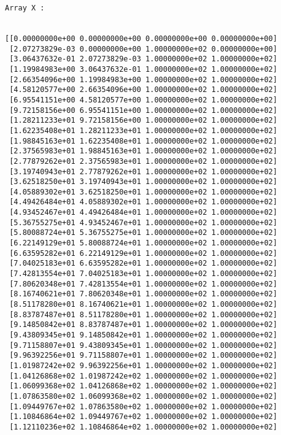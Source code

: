 \documentclass[11pt]{article}
\begin{document}
    \begin{Verbatim}[commandchars=\\\{\}]
Array X : 


[[0.00000000e+00 0.00000000e+00 0.00000000e+00 0.00000000e+00]
 [2.07273829e-03 0.00000000e+00 1.00000000e+02 0.00000000e+00]
 [3.06437632e-01 2.07273829e-03 1.00000000e+02 1.00000000e+02]
 [1.19984983e+00 3.06437632e-01 1.00000000e+02 1.00000000e+02]
 [2.66354096e+00 1.19984983e+00 1.00000000e+02 1.00000000e+02]
 [4.58120577e+00 2.66354096e+00 1.00000000e+02 1.00000000e+02]
 [6.95541151e+00 4.58120577e+00 1.00000000e+02 1.00000000e+02]
 [9.72158156e+00 6.95541151e+00 1.00000000e+02 1.00000000e+02]
 [1.28211233e+01 9.72158156e+00 1.00000000e+02 1.00000000e+02]
 [1.62235408e+01 1.28211233e+01 1.00000000e+02 1.00000000e+02]
 [1.98845163e+01 1.62235408e+01 1.00000000e+02 1.00000000e+02]
 [2.37565983e+01 1.98845163e+01 1.00000000e+02 1.00000000e+02]
 [2.77879262e+01 2.37565983e+01 1.00000000e+02 1.00000000e+02]
 [3.19740943e+01 2.77879262e+01 1.00000000e+02 1.00000000e+02]
 [3.62518250e+01 3.19740943e+01 1.00000000e+02 1.00000000e+02]
 [4.05889302e+01 3.62518250e+01 1.00000000e+02 1.00000000e+02]
 [4.49426484e+01 4.05889302e+01 1.00000000e+02 1.00000000e+02]
 [4.93452467e+01 4.49426484e+01 1.00000000e+02 1.00000000e+02]
 [5.36755275e+01 4.93452467e+01 1.00000000e+02 1.00000000e+02]
 [5.80088724e+01 5.36755275e+01 1.00000000e+02 1.00000000e+02]
 [6.22149129e+01 5.80088724e+01 1.00000000e+02 1.00000000e+02]
 [6.63595282e+01 6.22149129e+01 1.00000000e+02 1.00000000e+02]
 [7.04025183e+01 6.63595282e+01 1.00000000e+02 1.00000000e+02]
 [7.42813554e+01 7.04025183e+01 1.00000000e+02 1.00000000e+02]
 [7.80620348e+01 7.42813554e+01 1.00000000e+02 1.00000000e+02]
 [8.16740621e+01 7.80620348e+01 1.00000000e+02 1.00000000e+02]
 [8.51178280e+01 8.16740621e+01 1.00000000e+02 1.00000000e+02]
 [8.83787487e+01 8.51178280e+01 1.00000000e+02 1.00000000e+02]
 [9.14850842e+01 8.83787487e+01 1.00000000e+02 1.00000000e+02]
 [9.43809345e+01 9.14850842e+01 1.00000000e+02 1.00000000e+02]
 [9.71158807e+01 9.43809345e+01 1.00000000e+02 1.00000000e+02]
 [9.96392256e+01 9.71158807e+01 1.00000000e+02 1.00000000e+02]
 [1.01987242e+02 9.96392256e+01 1.00000000e+02 1.00000000e+02]
 [1.04126868e+02 1.01987242e+02 1.00000000e+02 1.00000000e+02]
 [1.06099368e+02 1.04126868e+02 1.00000000e+02 1.00000000e+02]
 [1.07863580e+02 1.06099368e+02 1.00000000e+02 1.00000000e+02]
 [1.09449767e+02 1.07863580e+02 1.00000000e+02 1.00000000e+02]
 [1.10846864e+02 1.09449767e+02 1.00000000e+02 1.00000000e+02]
 [1.12110236e+02 1.10846864e+02 1.00000000e+02 1.00000000e+02]

\end{Verbatim}
\end{document}
